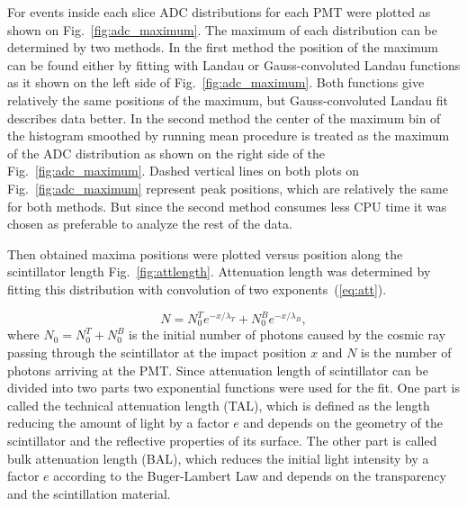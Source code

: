 For events inside each slice ADC distributions for each PMT were plotted as shown on Fig.~\ref{fig:adc_maximum}. The maximum of each distribution can be determined by two methods. In the first method the position of the maximum can be found either  by fitting
with Landau or Gauss-convoluted Landau functions as it shown on the left side of Fig.~\ref{fig:adc_maximum}. Both functions give relatively the same positions of the maximum, but Gauss-convoluted Landau fit describes data better. In the second method the center of the  maximum bin of the histogram smoothed by running mean procedure is treated as the maximum of the ADC distribution  as shown on the right side of the Fig.~\ref{fig:adc_maximum}. Dashed vertical lines on both plots on Fig.~\ref{fig:adc_maximum} represent peak positions, which are relatively the same for both methods. But since the second method consumes less CPU time it was chosen as preferable to analyze the rest of the data.  

Then obtained maxima positions were plotted versus position along the scintillator length Fig.~\ref{fig:attlength}. Attenuation length was determined by fitting this distribution with convolution of two exponents~(\ref{eq:att}).

\begin{equation}
N = N_{0}^{T}e^{-x/{\lambda_{T}}} +N_{0}^{B}e^{-x/{\lambda_{B}}}, \label{eq:att}
\end{equation} 
where $N_0 = N_0^{T} + N_0^{B}$ is the initial number of photons caused by the cosmic ray passing through the scintillator at the impact position $x$ and $N$ is the number of photons arriving
at the PMT.
Since attenuation length of scintillator can be divided into two parts two exponential functions were used for the fit. One part is called 
the technical attenuation length (TAL), which is defined as the length reducing the amount of
light by a factor $e$ and depends on the geometry of the scintillator and the reflective 
properties of its surface. The other part is called bulk attenuation length (BAL), which reduces the initial light intensity by a factor $e$ according to the Buger-Lambert Law and depends on the transparency and the scintillation material. 


